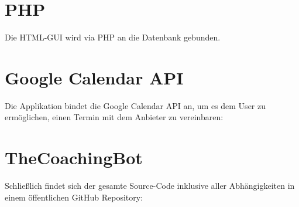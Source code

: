 \section{PHP}

Die HTML-GUI wird via PHP \cite{php} an die Datenbank gebunden.


\section{Google Calendar API}

Die Applikation bindet die Google Calendar API \cite{googleCalAPI} an, um es dem User zu ermöglichen, einen Termin mit dem Anbieter zu vereinbaren: 


\section{TheCoachingBot}

Schließlich findet sich der gesamte Source-Code inklusive aller Abhängigkeiten in einem öffentlichen GitHub Repository: \cite{repo} 